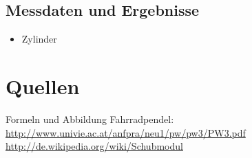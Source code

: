 \documentclass[12pt,a4paper]{article}
\begin{document}
\begin{multicols}{2}
\subsection{Messdaten und Ergebnisse}
\begin{itemize}
	\item Zylinder
\end{itemize}

\section{Quellen}
Formeln und Abbildung Fahrradpendel:\\
\url{http://www.univie.ac.at/anfpra/neu1/pw/pw3/PW3.pdf}\\
\url{http://de.wikipedia.org/wiki/Schubmodul}\\
\\

\end{multicols}
\end{document}
